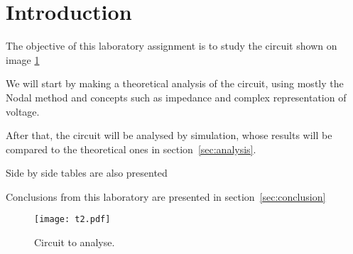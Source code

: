 \section{Introduction}

The objective of this laboratory assignment is to study the circuit shown on image \ref{Fig1: circuit}

We will start by making a theoretical analysis of the circuit, using mostly the Nodal method and concepts such as impedance and complex representation of voltage.

After that, the circuit will be analysed by simulation, whose results will be compared to the theoretical ones in section~\ref{sec:analysis}.

Side by side tables are also presented

Conclusions from this laboratory are presented in section~\ref{sec:conclusion}

\begin{figure}[h] \centering
\texttt{[image: t2.pdf]}
\caption{Circuit to analyse.}
\label{Fig1: circuit}
\end{figure}
